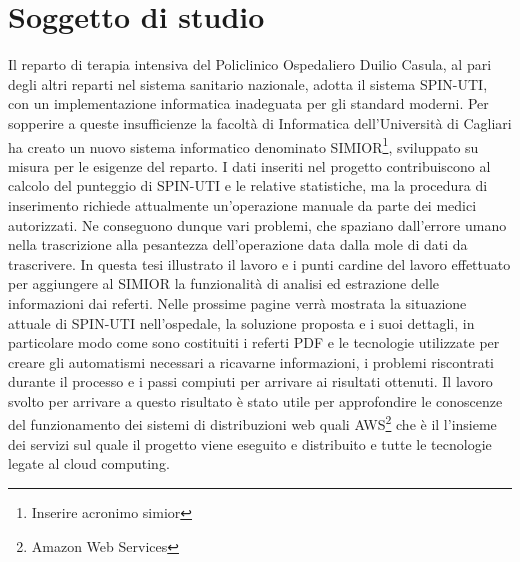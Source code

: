\section{Soggetto di studio}
Il reparto di terapia intensiva del Policlinico Ospedaliero Duilio Casula, al pari degli altri reparti nel sistema sanitario nazionale, adotta il sistema SPIN-UTI, con un 
implementazione informatica inadeguata per gli standard moderni. Per sopperire a queste insufficienze la facoltà di Informatica dell'Università di Cagliari ha creato un nuovo sistema informatico denominato SIMIOR\footnote{Inserire acronimo simior}, sviluppato su misura per le esigenze del reparto. I dati inseriti nel progetto contribuiscono al calcolo del punteggio di SPIN-UTI e le relative statistiche, ma la procedura di inserimento richiede attualmente un'operazione manuale da parte dei medici autorizzati. Ne conseguono dunque vari problemi, che spaziano dall'errore umano nella trascrizione alla pesantezza dell'operazione data dalla mole di dati da trascrivere.
In questa tesi illustrato il lavoro e i punti cardine del lavoro effettuato per aggiungere al SIMIOR la funzionalità di analisi ed estrazione delle informazioni dai referti. Nelle prossime pagine verrà mostrata la situazione attuale di SPIN-UTI nell'ospedale, la soluzione proposta e i suoi dettagli, in particolare modo come sono costituiti i referti PDF e le tecnologie utilizzate per creare gli automatismi necessari a ricavarne informazioni, i problemi riscontrati durante il processo e i passi compiuti per arrivare ai risultati ottenuti.
Il lavoro svolto per arrivare a questo risultato è stato utile per approfondire le conoscenze del funzionamento dei sistemi di distribuzioni web quali AWS\footnote{Amazon Web Services} che è il l'insieme dei servizi sul quale il progetto viene eseguito e distribuito e tutte le tecnologie legate al cloud computing.




